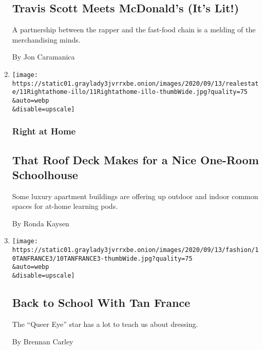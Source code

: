 \begin{enumerate}
  \hypertarget{travis-scott-meets-mcdonalds-its-lit}{%
  \subsection{Travis Scott Meets McDonald's (It's
  Lit!)}\label{travis-scott-meets-mcdonalds-its-lit}}

  A partnership between the rapper and the fast-food chain is a melding
  of the merchandising minds.

  By Jon Caramanica
\item
  \href{/2020/09/11/realestate/school-at-home.html}{}

  \texttt{[image: https://static01.graylady3jvrrxbe.onion/images/2020/09/13/realestate/11Rightathome-illo/11Rightathome-illo-thumbWide.jpg?quality=75\\\&auto=webp\\\&disable=upscale]}

  \hypertarget{right-at-home}{%
  \subsubsection{Right at Home}\label{right-at-home}}

  \hypertarget{that-roof-deck-makes-for-a-nice-one-room-schoolhouse}{%
  \subsection{That Roof Deck Makes for a Nice One-Room
  Schoolhouse}\label{that-roof-deck-makes-for-a-nice-one-room-schoolhouse}}

  Some luxury apartment buildings are offering up outdoor and indoor
  common spaces for at-home learning pods.

  By Ronda Kaysen
\item
  \href{/2020/09/11/style/tan-france-queer-eye-masterclass.html}{}

  \texttt{[image: https://static01.graylady3jvrrxbe.onion/images/2020/09/13/fashion/10TANFRANCE3/10TANFRANCE3-thumbWide.jpg?quality=75\\\&auto=webp\\\&disable=upscale]}

  \hypertarget{back-to-school-with-tan-france-1}{%
  \subsection{Back to School With Tan
  France}\label{back-to-school-with-tan-france-1}}

  The ``Queer Eye'' star has a lot to teach us about dressing.

  By Brennan Carley
\end{enumerate}

